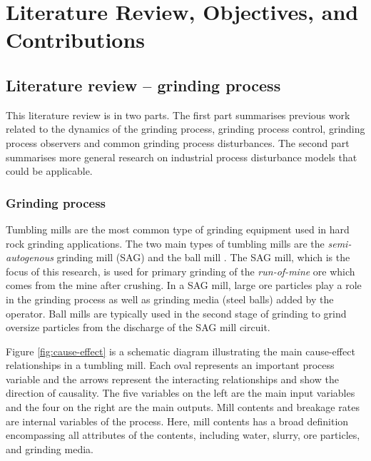 \chapter{Literature Review, Objectives, and Contributions}
\label{chap-lit-review}

\section{Literature review – grinding process}

This literature review is in two parts. The first part summarises previous work related to the dynamics of the grinding process, grinding process control, grinding process observers and common grinding process disturbances. The second part summarises more general research on industrial process disturbance models that could be applicable.

\subsection{Grinding process}

Tumbling mills are the most common type of grinding equipment used in hard rock grinding applications. The two main types of tumbling mills are the \textit{semi-autogenous} grinding mill (SAG) and the ball mill \citep{king_chapter_2012}. The SAG mill, which is the focus of this research, is used for primary grinding of the \textit{run-of-mine} ore which comes from the mine after crushing. In a SAG mill, large ore particles play a role in the grinding process as well as grinding media (steel balls) added by the operator. Ball mills are typically used in the second stage of grinding to grind oversize particles from the discharge of the SAG mill circuit.

Figure \ref{fig:cause-effect} is a schematic diagram illustrating the main cause-effect relationships in a tumbling mill. Each oval represents an important process variable and the arrows represent the interacting relationships and show the direction of causality. The five variables on the left are the main input variables and the four on the right are the main outputs. Mill contents and breakage rates are internal variables of the process. Here, mill contents has a broad definition encompassing all attributes of the contents, including water, slurry, ore particles, and grinding media.

